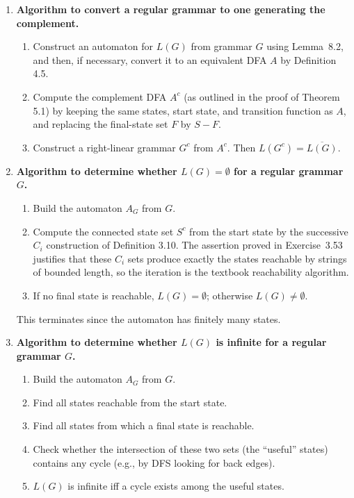 \begin{enumerate}[{8.}1. ]
\item \textbf{Algorithm to convert a regular grammar to one generating the complement.}

\begin{enumerate}
\item Construct an automaton for $L(G)$ from grammar $G$ using Lemma~8.2, and
then, if necessary, convert it to an equivalent DFA $A$ by Definition 4.5.
\item Compute the complement DFA $A^c$ (as outlined in the proof of Theorem 5.1) by keeping the same states, start state,
and transition function as $A$, and replacing the final-state set $F$ by
$S-F$.
\item Construct a right-linear grammar $G^c$ from $A^c$.
Then $L(G^c) = \overline{L(G)}$.
\end{enumerate}

\item \textbf{Algorithm to determine whether $L(G) = \emptyset$ for a regular grammar $G$.}

\begin{enumerate}
\item Build the automaton $A_G$ from $G$.
\item Compute the connected state set $S^c$ from the start state by the
successive $C_i$ construction of Definition 3.10.  The assertion
proved in Exercise~3.53 justifies that these $C_i$ sets produce exactly the
states reachable by strings of bounded length, so the iteration is the
textbook reachability algorithm.
\item If no final state is reachable, $L(G) = \emptyset$; otherwise $L(G) \neq \emptyset$.
\end{enumerate}
This terminates since the automaton has finitely many states.

\item \textbf{Algorithm to determine whether $L(G)$ is infinite for a regular grammar $G$.}

\begin{enumerate}
\item Build the automaton $A_G$ from $G$.
\item Find all states reachable from the start state.
\item Find all states from which a final state is reachable.
\item Check whether the intersection of these two sets (the ``useful'' states) contains any cycle (e.g., by DFS looking for back edges).
\item $L(G)$ is infinite iff a cycle exists among the useful states.
\end{enumerate}


\end{enumerate}
